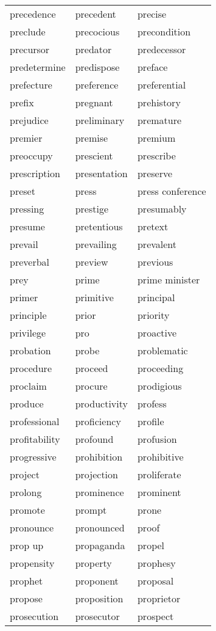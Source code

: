 \documentclass{minimal}
\begin{document}
\begin{longtable}{p{2.7cm}@{\hskip 0.2cm}p{2.7cm}@{\hskip 0.2cm}p{2.7cm}}
precedence & precedent & precise \\
preclude & precocious & precondition \\
precursor & predator & predecessor \\
predetermine & predispose & preface \\
prefecture & preference & preferential \\
prefix & pregnant & prehistory \\
prejudice & preliminary & premature \\
premier & premise & premium \\
preoccupy & prescient & prescribe \\
prescription & presentation & preserve \\
preset & press & press conference \\
pressing & prestige & presumably \\
presume & pretentious & pretext \\
prevail & prevailing & prevalent \\
preverbal & preview & previous \\
prey & prime & prime minister \\
primer & primitive & principal \\
principle & prior & priority \\
privilege & pro & proactive \\
probation & probe & problematic \\
procedure & proceed & proceeding \\
proclaim & procure & prodigious \\
produce & productivity & profess \\
professional & proficiency & profile \\
profitability & profound & profusion \\
progressive & prohibition & prohibitive \\
project & projection & proliferate \\
prolong & prominence & prominent \\
promote & prompt & prone \\
pronounce & pronounced & proof \\
prop up & propaganda & propel \\
propensity & property & prophesy \\
prophet & proponent & proposal \\
propose & proposition & proprietor \\
prosecution & prosecutor & prospect \\

\end{longtable}
\end{document}
